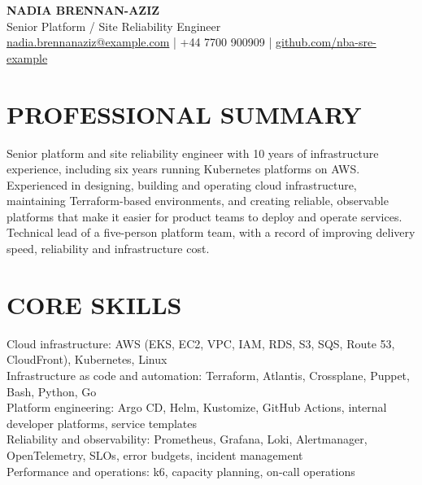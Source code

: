 \documentclass[11pt,a4paper]{article}
\begin{document}
\begin{center}
{\LARGE\bfseries NADIA BRENNAN-AZIZ}\\
Senior Platform / Site Reliability Engineer\\
\href{mailto:nadia.brennanaziz@example.com}{nadia.brennanaziz@example.com} | +44 7700 900909 | \href{https://github.com/nba-sre-example}{github.com/nba-sre-example}
\end{center}
\section*{PROFESSIONAL SUMMARY}
Senior platform and site reliability engineer with 10 years of infrastructure experience, including six years running Kubernetes platforms on AWS. Experienced in designing, building and operating cloud infrastructure, maintaining Terraform-based environments, and creating reliable, observable platforms that make it easier for product teams to deploy and operate services. Technical lead of a five-person platform team, with a record of improving delivery speed, reliability and infrastructure cost.
\section*{CORE SKILLS}
Cloud infrastructure: AWS (EKS, EC2, VPC, IAM, RDS, S3, SQS, Route 53, CloudFront), Kubernetes, Linux\\
Infrastructure as code and automation: Terraform, Atlantis, Crossplane, Puppet, Bash, Python, Go\\
Platform engineering: Argo CD, Helm, Kustomize, GitHub Actions, internal developer platforms, service templates\\
Reliability and observability: Prometheus, Grafana, Loki, Alertmanager, OpenTelemetry, SLOs, error budgets, incident management\\
Performance and operations: k6, capacity planning, on-call operations
\end{document}
